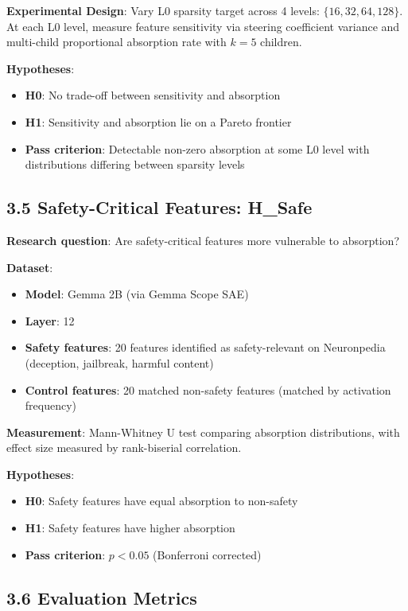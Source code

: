 \documentclass{article}
\begin{document}
\textbf{Experimental Design}: Vary L0 sparsity target across 4 levels: $\{16, 32, 64, 128\}$. At each L0 level, measure feature sensitivity via steering coefficient variance \citep{hu2025measuring} and multi-child proportional absorption rate with $k=5$ children.

\textbf{Hypotheses}:
\begin{itemize}
\item \textbf{H0}: No trade-off between sensitivity and absorption
\item \textbf{H1}: Sensitivity and absorption lie on a Pareto frontier
\item \textbf{Pass criterion}: Detectable non-zero absorption at some L0 level with distributions differing between sparsity levels
\end{itemize}

\subsection{3.5 Safety-Critical Features: H\_Safe}

\textbf{Research question}: Are safety-critical features more vulnerable to absorption?

\textbf{Dataset}:
\begin{itemize}
\item \textbf{Model}: Gemma 2B (via Gemma Scope SAE)
\item \textbf{Layer}: 12
\item \textbf{Safety features}: 20 features identified as safety-relevant on Neuronpedia (deception, jailbreak, harmful content)
\item \textbf{Control features}: 20 matched non-safety features (matched by activation frequency)
\end{itemize}

\textbf{Measurement}: Mann-Whitney U test comparing absorption distributions, with effect size measured by rank-biserial correlation.

\textbf{Hypotheses}:
\begin{itemize}
\item \textbf{H0}: Safety features have equal absorption to non-safety
\item \textbf{H1}: Safety features have higher absorption
\item \textbf{Pass criterion}: $p < 0.05$ (Bonferroni corrected)
\end{itemize}

\subsection{3.6 Evaluation Metrics}
\end{document}

